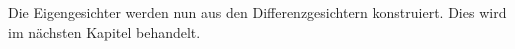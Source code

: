 Die Eigengesichter werden nun aus den Differenzgesichtern konstruiert.
Dies wird im nächsten Kapitel behandelt.
%
%
%
